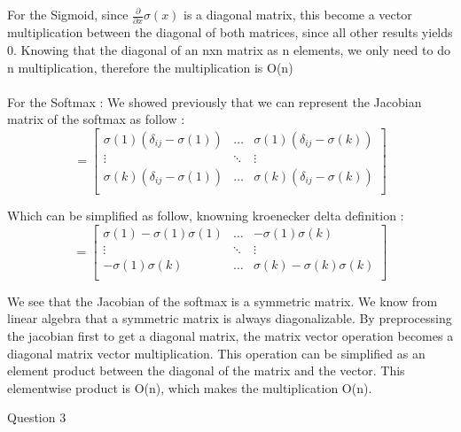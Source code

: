 \documentclass{article}
\begin{document}
\begin{enumerate}
	For the Sigmoid, since $\frac{\partial }{\partial x} \sigma(x)$ is a diagonal matrix, this become a vector multiplication between the diagonal of both matrices, since all other results yields 	          0.
	Knowing that the diagonal of an nxn matrix as n elements, we only need to do n multiplication, therefore the multiplication is O(n)\\ \\

	For the Softmax : We showed previously that we can represent the Jacobian matrix of the softmax as follow : \\

	 $$=\begin{bmatrix}
    \sigma(1) (\delta_{ij} - \sigma(1))  & \dots  &     \sigma(1) (\delta_{ij} - \sigma(k))  \\
    \vdots   & \ddots & \vdots \\
   \sigma(k) (\delta_{ij} - \sigma(1))   & \dots &  \sigma(k) (\delta_{ij} - \sigma(k))  \\
\end{bmatrix}$$

Which can be simplified as follow, knowning kroenecker delta definition :
	 $$=\begin{bmatrix}
     \sigma(1) - \sigma(1) \sigma(1) & \dots  &        - \sigma(1) \sigma(k)  \\
    \vdots   & \ddots & \vdots \\
      - \sigma(1) \sigma(k)   & \dots &    \sigma(k) - \sigma(k) \sigma(k)  \\
\end{bmatrix}$$

We see that the Jacobian of the softmax is a symmetric matrix. We know from linear algebra that a symmetric matrix is always diagonalizable. By preprocessing the jacobian first to get a diagonal matrix, the matrix vector operation becomes a diagonal matrix vector multiplication.
This operation can be simplified as an element product between the diagonal of the matrix and the vector. This elementwise product is O(n), which makes the multiplication O(n).


    \vspace{0.5cm}
   
  \end{enumerate}
  
\vspace{1cm}
 Question 3 \\
\end{document}
